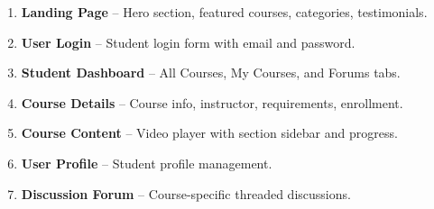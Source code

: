 \documentclass[12pt,a4paper]{report}
\begin{document}
\begin{enumerate}
    \item \textbf{Landing Page} -- Hero section, featured courses, categories, testimonials.

    \item \textbf{User Login} -- Student login form with email and password.

    \item \textbf{Student Dashboard} -- All Courses, My Courses, and Forums tabs.

    \item \textbf{Course Details} -- Course info, instructor, requirements, enrollment.

    \item \textbf{Course Content} -- Video player with section sidebar and progress.

    \item \textbf{User Profile} -- Student profile management.

    \item \textbf{Discussion Forum} -- Course-specific threaded discussions.


\end{enumerate}
\end{document}
